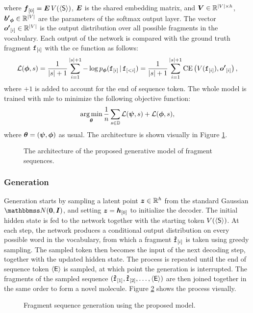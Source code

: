 where $\Elem{f}{0} = \Matrix{e}\,V(\SOS)$, $\Matrix{E}$ is the shared embedding matrix, and $\Matrix{V} \in \Real^{|V| \times h}$, $\Vector{b'}_{\DecParam} \in \Real^{|V|}$ are the parameters of the softmax output layer. The vector $\Elem{o'}{i} \in \Real^{|V|}$ is the output distribution over all possible fragments in the vocabulary. Each output of the network is compared with the ground truth fragment $\mathtt{f}_{[i]}$ with the \gls{ce} function as follows:
$$\Loss(\DecParam, s) = \frac{1}{|s| + 1} \sum_{i=1}^{|s|+1} -\log p_{\DecParam}(\Graph{f}_{[i]} \given \Graph{f}_{[<i]}) = \frac{1}{|s| + 1} \sum_{i=1}^{|s|+1} \Fun{CE}\Par{V(\Graph{f}_{[i]}), \Elem{o'}{i}},$$
where $+1$ is added to account for the end of sequence token. The whole model is trained with \gls{mle} to minimize the following objective function:
$$\argmin_{\Param} \frac{1}{n} \sum_{s \in \Data} \Loss(\EncParam, s) + \Loss(\DecParam, s),$$
where $\boldsymbol{\theta} = (\boldsymbol{\psi}, \boldsymbol{\phi})$ as usual. The architecture is shown visually in Figure \ref{fig:fragment-model-training}.

\begin{figure}[h!]
    \centering
    \resizebox{.99\textwidth}{!}{}
    \caption{The architecture of the proposed generative model of fragment sequences.}
    \label{fig:fragment-model-training}
\end{figure}

\subsubsection*{Generation}
Generation starts by sampling a latent point $\Vector{z} \in \Real^h$ from the standard Gaussian $\Normal{\Zeros}{\Matrix{I}}$,
and setting $\Vector{z} = \Elem{h}{0}$ to initialize the decoder. The initial hidden state is fed to the network together with the starting token $V(\mathsf{\langle S \rangle})$. At each step, the network produces a conditional output distribution on every possible word in the vocabulary, from which a fragment $\mathtt{\hat{f}}_{[i]}$ is taken using greedy sampling. The sampled token then becomes the input of the next decoding step, together with the updated hidden state. The process is repeated until the end of sequence token $\mathsf{\langle E \rangle}$ is sampled, at which point the generation is interrupted. The fragments of the sampled sequence $(\mathtt{\hat{f}}_{[1]},\mathtt{\hat{f}}_{[2]}, \ldots, \mathsf{\langle E \rangle})$ are then joined together in the same order to form a novel molecule. Figure \ref{fig:fragment-model-sampling} shows the process visually.
\begin{figure}[h!]
    \centering
    \resizebox{.55\textwidth}{!}{}
    \caption{Fragment sequence generation using the proposed model.}
    \label{fig:fragment-model-sampling}
\end{figure}

